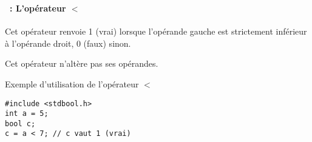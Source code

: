 \begin{frame}[containsverbatim]
  \frametitle{\secname}
  \framesubtitle{\subsecname~: L'opérateur $<$} 

  Cet opérateur renvoie 1 (vrai) lorsque l'opérande gauche est strictement inférieur à l'opérande droit, 0 (faux) sinon. 
  \par
  Cet opérateur n'altère pas ses opérandes.
  \vspace{0.3cm}
  \begin{exampleblock}{Exemple d'utilisation de l'opérateur $<$}
    \begin{verbatim}
#include <stdbool.h>
int a = 5;
bool c;
c = a < 7; // c vaut 1 (vrai)\end{verbatim}
  \end{exampleblock}
\end{frame}

